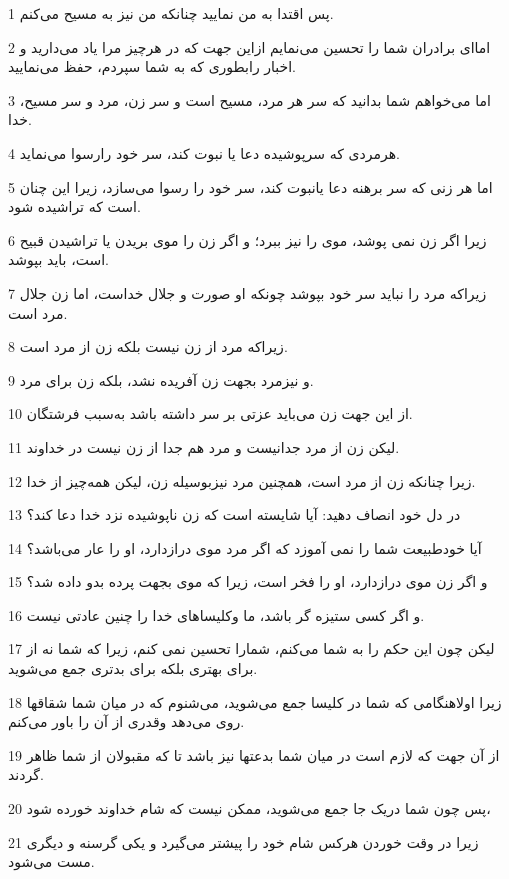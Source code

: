 \par 1 پس اقتدا به من نمایید چنانکه من نیز به مسیح می‌کنم.
\par 2 اما‌ای برادران شما را تحسین می‌نمایم ازاین جهت که در هرچیز مرا یاد می‌دارید و اخبار رابطوری که به شما سپردم، حفظ می‌نمایید.
\par 3 اما می‌خواهم شما بدانید که سر هر مرد، مسیح است و سر زن، مرد و سر مسیح، خدا.
\par 4 هرمردی که سرپوشیده دعا یا نبوت کند، سر خود رارسوا می‌نماید.
\par 5 اما هر زنی که سر برهنه دعا یانبوت کند، سر خود را رسوا می‌سازد، زیرا این چنان است که تراشیده شود.
\par 6 زیرا اگر زن نمی پوشد، موی را نیز ببرد؛ و اگر زن را موی بریدن یا تراشیدن قبیح است، باید بپوشد.
\par 7 زیراکه مرد را نباید سر خود بپوشد چونکه او صورت و جلال خداست، اما زن جلال مرد است.
\par 8 زیراکه مرد از زن نیست بلکه زن از مرد است.
\par 9 و نیزمرد بجهت زن آفریده نشد، بلکه زن برای مرد.
\par 10 از این جهت زن می‌باید عزتی بر سر داشته باشد به‌سبب فرشتگان.
\par 11 لیکن زن از مرد جدانیست و مرد هم جدا از زن نیست در خداوند.
\par 12 زیرا چنانکه زن از مرد است، همچنین مرد نیزبوسیله زن، لیکن همه‌چیز از خدا.
\par 13 در دل خود انصاف دهید: آیا شایسته است که زن ناپوشیده نزد خدا دعا کند؟
\par 14 آیا خودطبیعت شما را نمی آموزد که اگر مرد موی درازدارد، او را عار می‌باشد؟
\par 15 و اگر زن موی درازدارد، او را فخر است، زیرا که موی بجهت پرده بدو داده شد؟
\par 16 و اگر کسی ستیزه گر باشد، ما وکلیساهای خدا را چنین عادتی نیست.
\par 17 لیکن چون این حکم را به شما می‌کنم، شمارا تحسین نمی کنم، زیرا که شما نه از برای بهتری بلکه برای بدتری جمع می‌شوید.
\par 18 زیرا اولاهنگامی که شما در کلیسا جمع می‌شوید، می‌شنوم که در میان شما شقاقها روی می‌دهد وقدری از آن را باور می‌کنم.
\par 19 از آن جهت که لازم است در میان شما بدعتها نیز باشد تا که مقبولان از شما ظاهر گردند.
\par 20 پس چون شما دریک جا جمع می‌شوید، ممکن نیست که شام خداوند خورده شود،
\par 21 زیرا در وقت خوردن هرکس شام خود را پیشتر می‌گیرد و یکی گرسنه و دیگری مست می‌شود.
